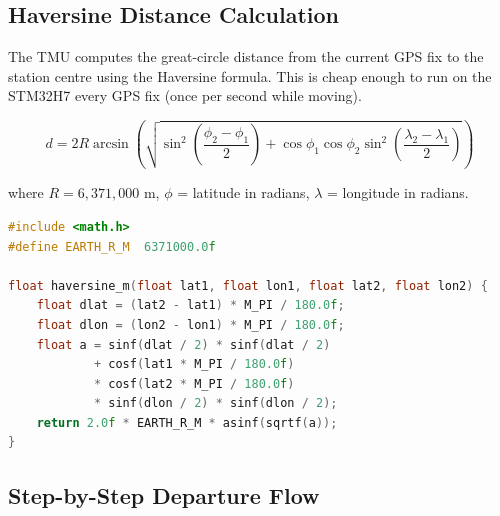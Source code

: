 \documentclass{article}
\begin{document}
\subsection{Haversine Distance Calculation}

The TMU computes the great-circle distance from the current GPS fix to the
station centre using the Haversine formula. This is cheap enough to run on the
STM32H7 every GPS fix (once per second while moving).

\begin{equation}
d = 2R \arcsin\!\left(\sqrt{
    \sin^2\!\left(\frac{\phi_2 - \phi_1}{2}\right)
    + \cos\phi_1\cos\phi_2\sin^2\!\left(\frac{\lambda_2 - \lambda_1}{2}\right)
}\right)
\end{equation}

where $R = 6{,}371{,}000$ m, $\phi$ = latitude in radians,
$\lambda$ = longitude in radians.

\begin{lstlisting}[language=c, caption=Haversine in C (STM32H7)]
#include <math.h>
#define EARTH_R_M  6371000.0f

float haversine_m(float lat1, float lon1, float lat2, float lon2) {
    float dlat = (lat2 - lat1) * M_PI / 180.0f;
    float dlon = (lon2 - lon1) * M_PI / 180.0f;
    float a = sinf(dlat / 2) * sinf(dlat / 2)
            + cosf(lat1 * M_PI / 180.0f)
            * cosf(lat2 * M_PI / 180.0f)
            * sinf(dlon / 2) * sinf(dlon / 2);
    return 2.0f * EARTH_R_M * asinf(sqrtf(a));
}
\end{lstlisting}

\subsection{Step-by-Step Departure Flow}
\end{document}
